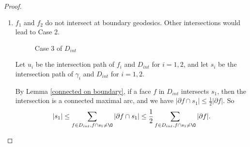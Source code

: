 \documentclass[a4paper]{article}
\newcommand{\vide}{\textup{\O}}
\theoremstyle{remark}
\begin{document}
\begin{proof}
\begin{enumerate}
    Let $u_i$ be the intersection path of $f_1$ and $D_{int}$ for $i=1,2$, $s$ be the remaining path on $\partial D_{int}$ and $v$ be the intersection path of $f_1,f_2$ (which may be empty). 
    
    Let us estimate the boundary length of $D_{ext}$. First, $|\partial D_{ext}| = |\partial f_1|+|\partial f_2|+|s|-|u_1|-|u_2|-2|v|$. Since $s$ is a geodesic path, it is shorter than $|v_1|+|v_2|$. We have
    \[|\partial D_{ext}|\leq |\partial f_1|+|\partial f_2|\leq 2\ell.\]
    
    Together with the isoperimetric inequality 
    \[|\partial D_{ext}|\geq (1-2d-\varepsilon)|D_{ext}|\ell,\] 
    
    we get
    \[d\geq \frac{|D_{ext}|-2}{2|D_{ext}|}-\varepsilon/2.\]

    As $|D_{ext}|\geq 3$, we have $d\geq 1/6-\varepsilon/2$, contradiction with any $\varepsilon<1/6-d$.

    \item $f_1$ and $f_2$ do not intersect at boundary geodesics. Other intersections would lead to Case 2.
    
    \begin{figure}[h]
\begin{center}
\end{center}
    \caption{Case 3 of $D_{int}$}
    \end{figure}
    
    Let $u_i$ be the intersection path of $f_i$ and $D_{int}$ for $i=1,2$, and let $s_i$ be the intersection path of $\gamma_i$ and $D_{int}$ for $i=1,2$.
    
    By Lemma \ref{connected on boundary}, if a face $f$ in $D_{int}$ intersects $s_1$, then the intersection is a connected maximal arc, and we have $|\partial f\cap s_1|\leq \frac{1}{2}|\partial f|$. So
    \[|s_1| \leq \sum_{f\in D_{int}, f\cap s_1\neq \vide} |\partial f\cap s_1|\leq \frac{1}{2}\sum_{f\in D_{int}, f\cap s_1\neq \vide} |\partial f|.\]


\end{enumerate}
\end{proof}
\end{document}
